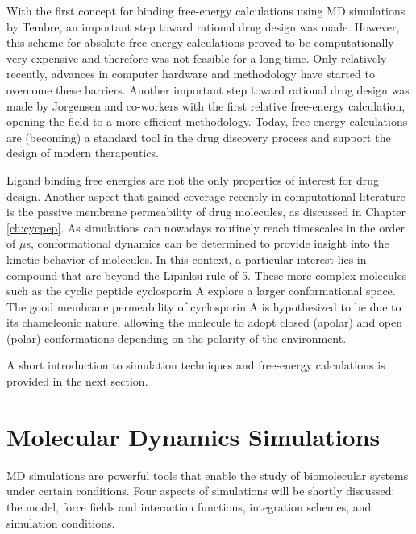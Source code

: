 With the first concept for binding free-energy calculations using MD simulations by Tembre\cite{Tembre1984}, an important step toward rational drug design was made. \cite{Durrant2011}
However, this scheme for absolute free-energy calculations proved to be computationally very expensive and therefore was not feasible for a long time. Only relatively recently, advances in computer hardware and methodology have started to overcome these barriers. \cite{Chodera2011, Aldeghi2016}
Another important step toward rational drug design was made by Jorgensen and co-workers with the first relative free-energy calculation, opening the field to a more efficient methodology.\cite{Jorgensen1988, Chodera2011} 
Today, free-energy calculations are (becoming) a standard tool in the drug discovery process and support the design of modern therapeutics. \cite{Chodera2011, Christ2014,  Cournia2017, Cournia2020, Jorgensen1983, Meier2021}
 
Ligand binding free energies are not the only properties of interest for drug design. Another aspect that gained coverage recently in computational literature is the passive membrane permeability of drug molecules, as discussed in Chapter \ref{ch:cycpep}. \cite{Witek2016, Witek2017, Witek2019,  Wang2021, Marrink1996, Bemporad2004, Sugita2021, Corbett2021} 
As simulations can nowadays routinely reach timescales in the order of $\mu$s, conformational dynamics can be determined to provide insight into the kinetic behavior of molecules.\cite{Witek2016, Witek2017} In this context, a particular interest lies in compound that are beyond the Lipinksi\cite{Lipinski2001} rule-of-5.\cite{Witek2016, Witek2017, Witek2019,  Wang2021, Sugita2021} These more complex molecules such as the cyclic peptide cyclosporin A explore a larger conformational space. The good membrane permeability of cyclosporin A is hypothesized to be due to its chameleonic nature, allowing the molecule to adopt closed (apolar) and open (polar) conformations depending on the polarity of the environment.\cite{Witek2016, Witek2017}

A short introduction to simulation techniques and free-energy calculations is provided in the next section.

\section{Molecular Dynamics Simulations}
MD simulations are powerful tools that enable the study of biomolecular systems under certain conditions. Four aspects of simulations will be shortly discussed: the model, force fields and interaction functions, integration schemes, and simulation conditions.

